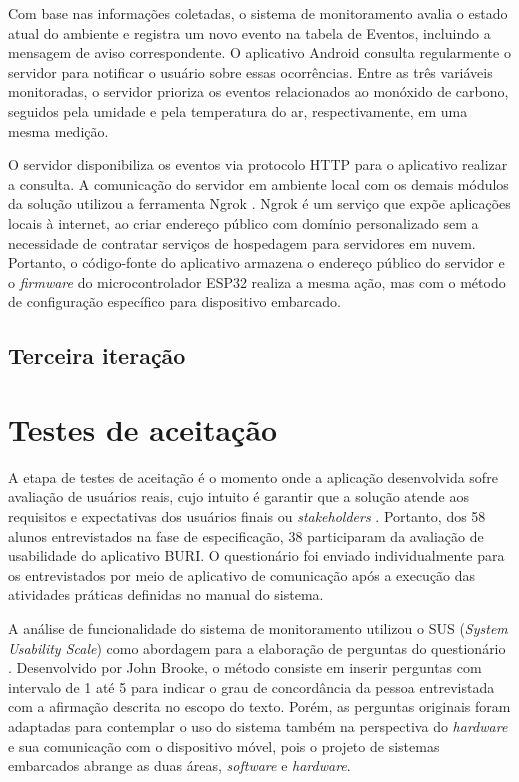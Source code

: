 Com base nas informações coletadas, o sistema de monitoramento avalia o estado atual do ambiente e registra um novo evento na 
tabela de Eventos, incluindo a mensagem de aviso correspondente. O aplicativo Android consulta regularmente o servidor para notificar 
o usuário sobre essas ocorrências. Entre as três variáveis monitoradas, o servidor prioriza os eventos relacionados ao monóxido de 
carbono, seguidos pela umidade e pela temperatura do ar, respectivamente, em uma mesma medição. 

O servidor disponibiliza os eventos via protocolo HTTP para o aplicativo realizar a consulta. A comunicação do servidor em ambiente local com os 
demais módulos da solução utilizou a ferramenta Ngrok \cite{ngrok}. Ngrok é um serviço que expõe aplicações 
locais à internet, ao criar endereço público com domínio personalizado sem a necessidade de contratar serviços de 
hospedagem para servidores em nuvem. Portanto, o código-fonte do aplicativo armazena o endereço público do servidor e o \textit{firmware} do microcontrolador 
ESP32 realiza a mesma ação, mas com o método de configuração específico para dispositivo embarcado.

\subsection{Terceira iteração}\label{ExecAtv3It}

\section{Testes de aceitação}\label{fase5}

A etapa de testes de aceitação é o momento onde a aplicação desenvolvida sofre avaliação 
de usuários reais, cujo intuito é garantir que a solução atende aos requisitos e expectativas dos usuários finais ou \textit{stakeholders} \cite{system-design-IOT}. 
Portanto, dos 58 alunos entrevistados na fase de especificação, 38 participaram da avaliação de usabilidade do 
aplicativo BURI. O questionário foi enviado individualmente para os entrevistados por meio de aplicativo de comunicação após 
a execução das atividades práticas definidas no manual do sistema.

A análise de funcionalidade do sistema de monitoramento utilizou o SUS (\textit{System Usability Scale}) como abordagem para a elaboração de perguntas do questionário \cite{sus-design-questionario}. Desenvolvido por John Brooke, o método 
consiste em inserir perguntas com intervalo de 1 até 5 para indicar o grau de concordância da pessoa entrevistada com a afirmação descrita no escopo do texto. Porém, as perguntas originais foram adaptadas para contemplar o uso do sistema 
também na perspectiva do \textit{hardware} e sua comunicação com o dispositivo móvel, pois o projeto de sistemas embarcados abrange as duas áreas, \textit{software} e \textit{hardware}.

